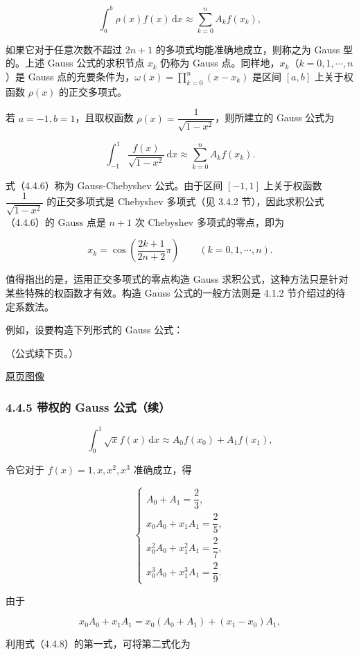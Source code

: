 \documentclass[
  10pt,
  fontset=fandol]{ctexart}
\begin{document}
\[
\int_a^b\rho(x)f(x)\,\mathrm{d}x\approx\sum_{k=0}^{n}A_kf(x_k),
\]

如果它对于任意次数不超过 \(2n+1\) 的多项式均能准确地成立，则称之为 Gauss 型的。上述 Gauss 公式的求积节点 \(x_k\) 仍称为 Gauss 点。同样地，\(x_k\)（\(k=0,1,\cdots,n\)）是 Gauss 点的充要条件为，\(\displaystyle\omega(x)=\prod_{k=0}^{n}(x-x_k)\) 是区间 \([a,b]\) 上关于权函数 \(\rho(x)\) 的正交多项式。

若 \(a=-1,b=1\)，且取权函数 \(\rho(x)=\dfrac1{\sqrt{1-x^2}}\)，则所建立的 Gauss 公式为

\[
\int_{-1}^{1}\frac{f(x)}{\sqrt{1-x^2}}\,\mathrm{d}x
\approx\sum_{k=0}^{n}A_kf(x_k).
\tag{4.4.6}
\]

式（4.4.6）称为 Gauss-Chebyshev 公式。由于区间 \([-1,1]\) 上关于权函数 \(\dfrac1{\sqrt{1-x^2}}\) 的正交多项式是 Chebyshev 多项式（见 3.4.2 节），因此求积公式（4.4.6）的 Gauss 点是 \(n+1\) 次 Chebyshev 多项式的零点，即为

\[
x_k=\cos\left(\frac{2k+1}{2n+2}\pi\right)\qquad(k=0,1,\cdots,n).
\]

值得指出的是，运用正交多项式的零点构造 Gauss 求积公式，这种方法只是针对某些特殊的权函数才有效。构造 Gauss 公式的一般方法则是 4.1.2 节介绍过的待定系数法。

例如，设要构造下列形式的 Gauss 公式：

（公式续下页。）

\href{../../source-images/pdf-111.jpeg}{原页图像}

\subsubsection{4.4.5 带权的 Gauss 公式（续）}\label{ux5e26ux6743ux7684-gauss-ux516cux5f0fux7eed}

\[
\int_0^1\sqrt{x}f(x)\,\mathrm{d}x\approx A_0f(x_0)+A_1f(x_1),
\tag{4.4.7}
\]

令它对于 \(f(x)=1,x,x^2,x^3\) 准确成立，得

\[
\begin{cases}
A_0+A_1=\dfrac23,\\[5pt]
x_0A_0+x_1A_1=\dfrac25,\\[5pt]
x_0^2A_0+x_1^2A_1=\dfrac27,\\[5pt]
x_0^3A_0+x_1^3A_1=\dfrac29.
\end{cases}
\tag{4.4.8}
\]

由于

\[
x_0A_0+x_1A_1=x_0(A_0+A_1)+(x_1-x_0)A_1,
\]

利用式（4.4.8）的第一式，可将第二式化为
\end{document}
